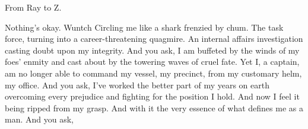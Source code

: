 From Ray to Z.

Nothing's okay.
Wuntch Circling me like a shark frenzied by chum.
The task force, turning into a career-threatening quagmire.
An internal affairs investigation casting doubt upon my integrity.
And you ask, 
I am buffeted by the winds of my foes' enmity and cast about by the towering waves of cruel fate.
Yet I, a captain, am no longer able to command my vessel, my precinct, from my customary helm, my office.
And you ask, 
I've worked the better part of my years on earth overcoming every prejudice and fighting for the position I hold.
And now I feel it being ripped from my grasp.
And with it the very essence of what defines me as a man.
And you ask, 
